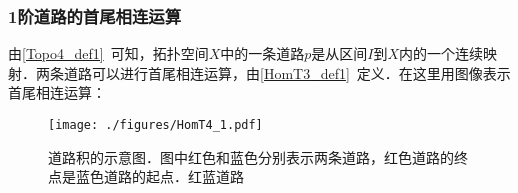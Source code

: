 \subsubsection{1阶道路的首尾相连运算}

由\autoref{Topo4_def1}~可知，拓扑空间$X$中的一条道路$p$是从区间$I$到$X$内的一个连续映射．两条道路可以进行首尾相连运算，由\autoref{HomT3_def1}~定义．在这里用图像表示首尾相连运算：


\begin{figure}[ht]
\centering
\texttt{[image: ./figures/HomT4\_1.pdf]}
\caption{道路积的示意图．图中红色和蓝色分别表示两条道路，红色道路的终点是蓝色道路的起点．红蓝道路} \label{HomT4_fig1}
\end{figure}






